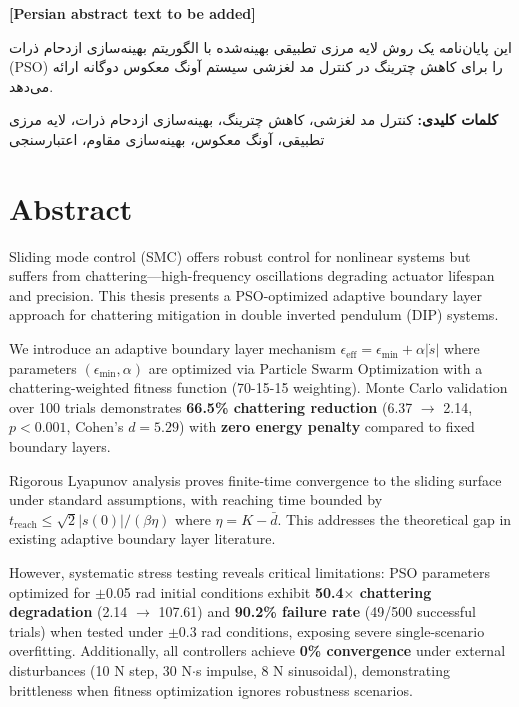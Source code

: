 \documentclass[12pt,a4paper,oneside]{report}
\newcommand{\eeff}{\epsilon_{\text{eff}}}
\newcommand{\emin}{\epsilon_{\min}}
\newcommand{\treach}{t_{\text{reach}}}
\newcommand{\dbar}{\bar{d}}
\begin{document}

\textbf{[Persian abstract text to be added]}

این پایان‌نامه یک روش لایه مرزی تطبیقی بهینه‌شده با الگوریتم بهینه‌سازی ازدحام ذرات (PSO) را برای کاهش چترینگ در کنترل مد لغزشی سیستم آونگ معکوس دوگانه ارائه می‌دهد.

\textbf{کلمات کلیدی:} کنترل مد لغزشی، کاهش چترینگ، بهینه‌سازی ازدحام ذرات، لایه مرزی تطبیقی، آونگ معکوس، بهینه‌سازی مقاوم، اعتبارسنجی

\chapter*{Abstract}

Sliding mode control (SMC) offers robust control for nonlinear systems but suffers from chattering—high-frequency oscillations degrading actuator lifespan and precision. This thesis presents a PSO-optimized adaptive boundary layer approach for chattering mitigation in double inverted pendulum (DIP) systems.

We introduce an adaptive boundary layer mechanism $\eeff = \emin + \alpha|\dot{s}|$ where parameters $(\emin, \alpha)$ are optimized via Particle Swarm Optimization with a chattering-weighted fitness function (70-15-15 weighting). Monte Carlo validation over 100 trials demonstrates \textbf{66.5\% chattering reduction} (6.37 $\rightarrow$ 2.14, $p < 0.001$, Cohen's $d = 5.29$) with \textbf{zero energy penalty} compared to fixed boundary layers.

Rigorous Lyapunov analysis proves finite-time convergence to the sliding surface under standard assumptions, with reaching time bounded by $\treach \leq \sqrt{2}|s(0)|/(\beta\eta)$ where $\eta = K - \dbar$. This addresses the theoretical gap in existing adaptive boundary layer literature.

However, systematic stress testing reveals critical limitations: PSO parameters optimized for $\pm$0.05 rad initial conditions exhibit \textbf{50.4$\times$ chattering degradation} (2.14 $\rightarrow$ 107.61) and \textbf{90.2\% failure rate} (49/500 successful trials) when tested under $\pm$0.3 rad conditions, exposing severe single-scenario overfitting. Additionally, all controllers achieve \textbf{0\% convergence} under external disturbances (10 N step, 30 N$\cdot$s impulse, 8 N sinusoidal), demonstrating brittleness when fitness optimization ignores robustness scenarios.
\end{document}
